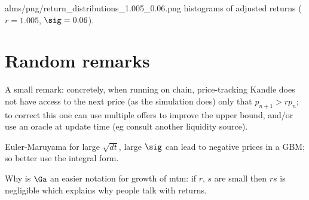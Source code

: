 \documentclass[oneside,12pt]{article}
\begin{document}
\IG{420pt}
{alms/png/return_distributions_1.005_0.06.png}
{\label{1.005-0.06h} histograms of adjusted returns ($r=1.005$, $\sig=0.06$).}

\section{Random remarks}

A small remark: concretely, when running on chain, price-tracking Kandle does not have access to the next price (as the simulation does)
only that $p_{n+1}>r p_n$;
to correct this one can use multiple offers to improve the upper bound,
and/or use an oracle at update time (eg consult another liquidity source).

Euler-Maruyama for large $\sqrt{dt}$, large $\sig$ can lead to negative prices in a GBM;
so better use the integral form. 


Why is $\Ga$ an easier notation for growth of mtm:
if $r$, $s$ are small then $rs$ is negligible which explains why people talk with returns.



\end{document}
